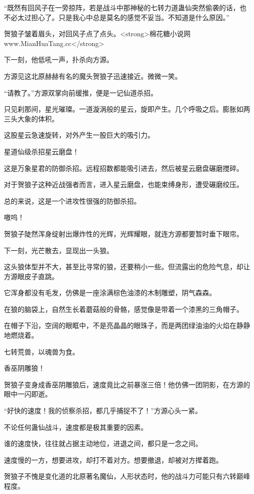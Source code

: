 \begin{this_body}
“既然有回风子在一旁掠阵，若是战斗中那神秘的七转力道蛊仙突然偷袭的话，也不必太过担心了。只是我心中总是莫名的感觉不妥当。不知道是什么原因。”

贺狼子皱着眉头，对回风子点了点头。<strong>棉花糖小说网www.MianHuaTang.cc</strong>

下一刻，他低吼一声，扑杀向方源。

方源见这北原赫赫有名的魔头贺狼子迅速接近。微微一笑。

“请教了。”方源双掌向前缓推，便是一记仙道杀招。

只见刹那间，星光璀璨。一道漩涡般的星云，旋即产生。几个呼吸之后。膨胀如两三头大象的体积。

这股星云急速旋转，对外产生一股巨大的吸引力。

星道仙级杀招星云磨盘！

这是万象星君的防御杀招。远程招数都能吸引进去，然后被星云磨盘碾磨搅碎。

对于贺狼子这种近战强者而言，进入星云磨盘，也能束缚身形，遭受碾磨绞压。

总的来说，这是一个进攻性很强的防御杀招。

嗷呜！

贺狼子陡然浑身绽射出爆炸性的光辉，光辉耀眼，就连方源都要暂时垂下眼帘。

下一刻，光芒散去，显现出一头狼。

这头狼体型并不大，甚至比寻常的狼，还要稍小一些。但流露出的危险气息，却让方源眼皮子直跳。

它浑身都没有毛发，仿佛是一座涂满棕色油漆的木制雕塑，阴气森森。

在狼的脑袋上，自然生长着蘑菇般的骨骼，感觉像是带着一个漆黑的三角帽子。

在帽子下沿，空阔的眼眶中，不是亮晶晶的眼珠子，而是两团绿油油的火焰在静静地燃烧着。

七转荒兽，以魂兽为食。

香巫阴雕狼！

贺狼子变身成香巫阴雕狼后，速度竟比之前暴涨三倍！他仿佛一团阴影，在方源的眼中一闪即逝。

“好快的速度！我的侦察杀招，都几乎捕捉不了！”方源心头一紧。

不论任何蛊仙战斗，速度都是极其重要的因素。

谁的速度快，往往就占据主动地位，进退之间，都只是一念之间。

速度慢的一方，想要进攻，却打不着对方。想要撤退，却被对方撵着跑。

贺狼子不愧是变化道的北原著名魔仙，人形状态时，他的战斗力可能只有六转巅峰程度。


\end{this_body}
